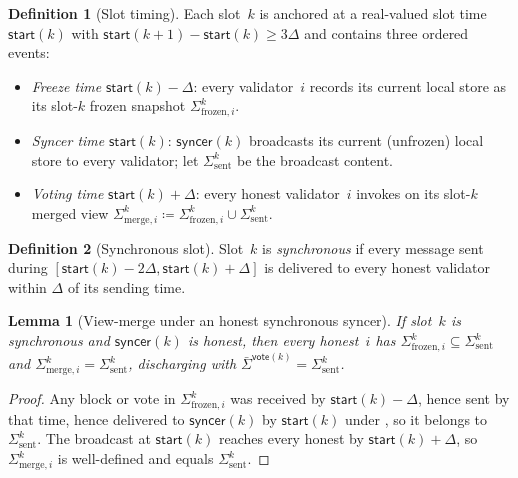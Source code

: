 \ifx\litemode\undefined\documentclass{article}\fi
\newcommand{\syncer}{\mathsf{syncer}}
\newcommand{\start}{\mathsf{start}}
\newcommand{\vote}{\mathsf{vote}}
\newcommand{\comm}[1]{\bar{#1}}
\theoremstyle{plain}
\newtheorem{lemma}{Lemma}
\theoremstyle{definition}
\newtheorem{definition}{Definition}
\theoremstyle{remark}
\begin{document}
\begin{definition}[Slot timing]\label{rev:def:slot-timing}
Each slot~$k$ is anchored at a real-valued slot time $\start(k)$ with $\start(k+1) - \start(k) \geq 3\Delta$ and contains three ordered events:
\begin{itemize}
  \item \emph{Freeze time} $\start(k) - \Delta$: every validator~$i$ records its current local store as its slot-$k$ frozen snapshot $\Sigma^k_{\mathrm{frozen},i}$.
  \item \emph{Syncer time} $\start(k)$: $\syncer(k)$ broadcasts its current (unfrozen) local store to every validator; let $\Sigma^k_{\mathrm{sent}}$ be the broadcast content.
  \item \emph{Voting time} $\start(k) + \Delta$: every honest validator~$i$ invokes  on its slot-$k$ merged view $\Sigma^k_{\mathrm{merge},i} \coloneqq \Sigma^k_{\mathrm{frozen},i} \cup \Sigma^k_{\mathrm{sent}}$.
\end{itemize}
\end{definition}

\begin{definition}[Synchronous slot]\label{rev:def:synchrony-window}
Slot~$k$ is \emph{synchronous} if every message sent during $[\start(k) - 2\Delta, \start(k) + \Delta]$ is delivered to every honest validator within $\Delta$ of its sending time.
\end{definition}

\begin{lemma}[View-merge under an honest synchronous syncer]\label{rev:lem:view-merge}
If slot~$k$ is synchronous and $\syncer(k)$ is honest, then every honest~$i$ has $\Sigma^k_{\mathrm{frozen},i} \subseteq \Sigma^k_{\mathrm{sent}}$ and $\Sigma^k_{\mathrm{merge},i} = \Sigma^k_{\mathrm{sent}}$, discharging  with $\comm{\Sigma}^{\vote(k)} = \Sigma^k_{\mathrm{sent}}$.
\end{lemma}

\begin{proof}
Any block or vote in $\Sigma^k_{\mathrm{frozen},i}$ was received by $\start(k) - \Delta$, hence sent by that time, hence delivered to $\syncer(k)$ by $\start(k)$ under , so it belongs to $\Sigma^k_{\mathrm{sent}}$.
The broadcast at $\start(k)$ reaches every honest by $\start(k) + \Delta$, so $\Sigma^k_{\mathrm{merge},i}$ is well-defined and equals $\Sigma^k_{\mathrm{sent}}$.
\end{proof}
\end{document}
